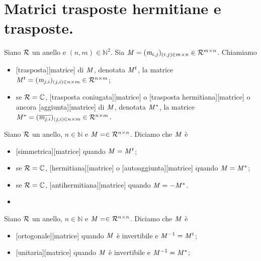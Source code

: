 \section{Matrici trasposte hermitiane e trasposte.}
\label{Matrici_MatriciTrasposteHermitianeETrasposte}
\begin{Definition}
	Siano $\mathcal{R}$ un anello e $(n,m) \in \mathbb{N}^2$. Sia $\mathit{M} = (\mathit{m}_{i,j})_{(i,j) \in m \times n} \in \mathcal{R}^{m \times n}$. Chiamiamo
	\begin{itemize}
		\item {}[trasposta][matrice] di $\mathit{M}$, denotata ${\mathit{M}}^t$, la matrice ${\mathit{M}}^t = (\mathit{m}_{j,i})_{(j,i) \in n \times m} \in \mathcal{R}^{n \times m}$;
		\item se $\mathcal{R} = \mathbb{C}$, [trasposta coniugata][matrice] o [trasposta hermitiana][matrice] o ancora [aggiunta][matrice] di $\mathit{M}$, denotata ${\mathit{M}}^*$, la matrice ${\mathit{M}}^* = (\overline{\mathit{m}_{j,i}})_{(j,i) \in n \times m} \in \mathcal{R}^{n \times m}$.
	\end{itemize}
\end{Definition}
\begin{Definition}
	Siano $\mathcal{R}$ un anello, $n \in \mathbb{N}$ e $\mathit{M} = \in \mathcal{R}^{n \times n}$. Diciamo che $\mathit{M}$ \`e
	\begin{itemize}
		\item {}[simmetrica][matrice] quando $\mathit{M} = {\mathit{M}}^t$;
		\item se $\mathcal{R} = \mathbb{C}$, [hermitiana][matrice] o [autoaggiunta][matrice] quando $\mathit{M} = {\mathit{M}}^*$;
		\item se $\mathcal{R} = \mathbb{C}$, [antihermitiana][matrice] quando $\mathit{M} = - {\mathit{M}}^*$.
		\item
	\end{itemize}
\end{Definition}
\begin{Definition}
	Siano $\mathcal{R}$ un anello, $n \in \mathbb{N}$ e $\mathit{M} = \in \mathcal{R}^{n \times n}$. Diciamo che $\mathit{M}$ \`e
	\begin{itemize}
		\item {}[ortogonale][matrice] quando $\mathit{M}$ \`e invertibile e $\mathit{M}^{-1} = {\mathit{M}}^t$;
		\item {}[unitaria][matrice] quando $\mathit{M}$ \`e invertibile e $\mathit{M}^{-1} = {\mathit{M}}^*$;
	\end{itemize}
\end{Definition}
